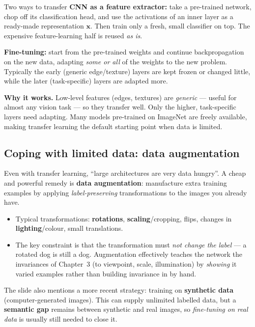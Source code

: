 \documentclass{report}
\newcommand{\xvec}{\mathbf{x}}
\begin{document}
\begin{defbox}{Two ways to transfer}
\textbf{CNN as a feature extractor:} take a pre-trained network, chop off its
classification head, and use the activations of an inner layer as a ready-made
representation $\xvec$. Then train only a fresh, small classifier on top. The
expensive feature-learning half is reused \emph{as is}.

\medskip
\textbf{Fine-tuning:} start from the pre-trained weights and continue
backpropagation on the new data, adapting \emph{some or all} of the weights to
the new problem. Typically the early (generic edge/texture) layers are kept
frozen or changed little, while the later (task-specific) layers are adapted
more.
\end{defbox}

\begin{keybox}
\textbf{Why it works.} Low-level features (edges, textures) are \emph{generic}
--- useful for almost any vision task --- so they transfer well. Only the
higher, task-specific layers need adapting. Many models pre-trained on ImageNet
are freely available, making transfer learning the default starting point when
data is limited.
\end{keybox}

\subsection{Coping with limited data: data augmentation}

Even with transfer learning, ``large architectures are very data hungry''. A
cheap and powerful remedy is \textbf{data augmentation}: manufacture extra
training examples by applying \emph{label-preserving} transformations to the
images you already have.

\begin{itemize}
\item Typical transformations: \textbf{rotations}, \textbf{scaling}/cropping,
flips, changes in \textbf{lighting}/colour, small translations.
\item The key constraint is that the transformation must \emph{not change the
label} --- a rotated dog is still a dog. Augmentation effectively teaches the
network the invariances of Chapter~3 (to viewpoint, scale, illumination) by
\emph{showing} it varied examples rather than building invariance in by hand.
\end{itemize}

The slide also mentions a more recent strategy: training on \textbf{synthetic
data} (computer-generated images). This can supply unlimited labelled data, but
a \textbf{semantic gap} remains between synthetic and real images, so
\emph{fine-tuning on real data} is usually still needed to close it.
\end{document}
